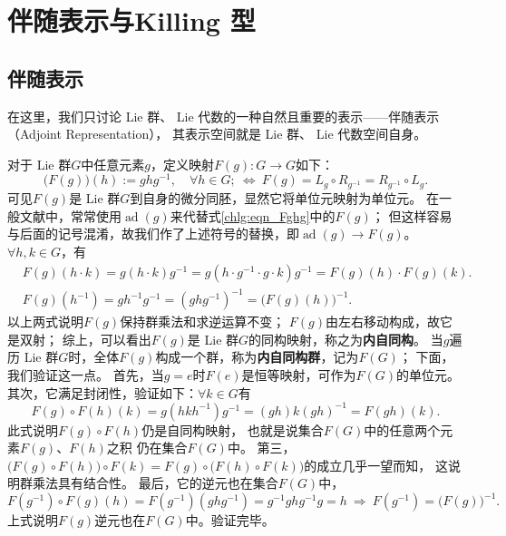 \section{伴随表示与Killing 型}
\subsection{伴随表示}\label{chlg:sec_adjoint}
在这里，我们只讨论 Lie 群、 Lie 代数的一种自然且重要的表示——伴随表示（Adjoint Representation），
其表示空间就是 Lie 群、 Lie 代数空间自身。

对于 Lie 群$G$中任意元素$g$，定义映射$F(g):G\to G$如下：
\begin{equation}\label{chlg:eqn_Fghg}
    \bigl(F(g)\bigr) (h) := g h g^{-1},\quad \forall h\in G;
    \ \Leftrightarrow \
    F(g) = L_g \circ R_{g^{-1}} = R_{g^{-1}}\circ L_g .
\end{equation}
可见$F(g)$是 Lie 群$G$到自身的微分同胚，显然它将单位元映射为单位元。
在一般文献中，常常使用$\operatorname{ad}(g)$来代替式\eqref{chlg:eqn_Fghg}中的$F(g)$；
但这样容易与后面的记号混淆，故我们作了上述符号的替换，即$\operatorname{ad}(g) \to F(g)$。
$\forall h,k\in G$，有
\begin{align}
    &F(g) (h\cdot k) = g(h\cdot k)g^{-1}=g(h\cdot g^{-1} \cdot g\cdot k)g^{-1}
    =F(g) (h) \cdot F(g) (k) . \\
    &F(g)(h^{-1}) = gh^{-1}g^{-1} = (ghg^{-1})^{-1} = \bigl(F(g) (h)\bigr)^{-1} .
\end{align}
以上两式说明$F(g)$保持群乘法和求逆运算不变；
$F(g)$由左右移动构成，故它是双射；
综上，可以看出$F(g)$是 Lie 群$G$的同构映射，称之为\textbf{内自同构}。
当$g$遍历 Lie 群$G$时，全体$F(g)$构成一个群，称为\textbf{内自同构群}，记为$F(G)$；
下面，我们验证这一点。
首先，当$g=e$时$F(e)$是恒等映射，可作为$F(G)$的单位元。
其次，它满足封闭性，验证如下：$\forall k\in G$有
\begin{equation}\label{chlg:eqn_tmpffkk}
    F(g)\circ F(h) (k) = g(hkh^{-1})g^{-1}
    =(gh) k (gh)^{-1} = F(gh)(k) .
\end{equation}
此式说明$F(g)\circ F(h)$仍是自同构映射，
也就是说集合$F(G)$中的任意两个元素$F(g)$、$ F(h)$之积
仍在集合$F(G)$中。
第三，$\bigl(F(g)\circ F(h)\bigr)\circ F(k)
=F(g)\circ\bigl( F(h)\circ F(k)\bigr)$的成立几乎一望而知，
这说明群乘法具有结合性。
最后，它的逆元也在集合$F(G)$中，
\begin{equation*}
    F(g^{-1})\circ F(g) (h)=F(g^{-1})(g h g^{-1} ) = g^{-1} g h g^{-1} g = h
    \ \Rightarrow \  F(g^{-1}) = \bigl( F(g)\bigr)^{-1} .
\end{equation*}
上式说明$F(g)$逆元也在$F(G)$中。验证完毕。


